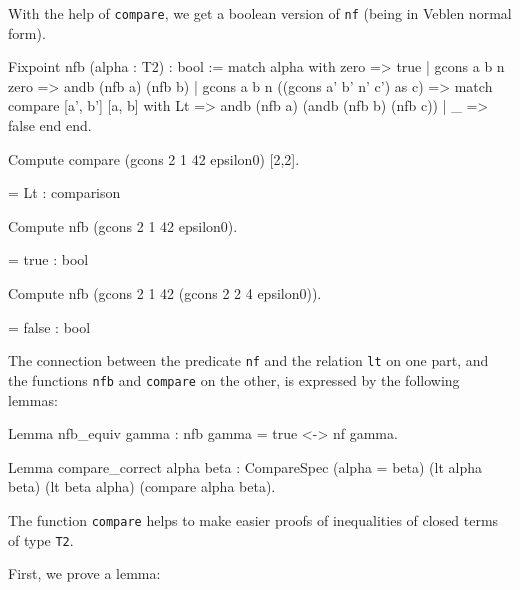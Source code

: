 {With the help of \texttt{compare}, we get a boolean version of \texttt{nf}
(being in Veblen normal form).

\begin{Coqsrc}
Fixpoint nfb (alpha : T2) : bool :=
  match alpha with
    zero => true
  | gcons a b n zero => andb (nfb a) (nfb b)
  | gcons a b n ((gcons a' b' n' c') as c) =>
    match compare [a', b'] [a, b] with
           Lt => andb (nfb a) (andb (nfb b) (nfb c))
           | _ => false
           end
end.
\end{Coqsrc}


\begin{Coqsrc}
Compute compare (gcons 2 1 42 epsilon0) [2,2].
\end{Coqsrc}

\begin{Coqanswer}
   = Lt
     : comparison
\end{Coqanswer}

\begin{Coqsrc}
Compute nfb  (gcons 2 1 42 epsilon0).
\end{Coqsrc}

\begin{Coqanswer}
   = true
     : bool
\end{Coqanswer}

\begin{Coqsrc}
Compute nfb (gcons 2 1 42 (gcons 2 2 4 epsilon0)).
\end{Coqsrc}

\begin{Coqanswer}
   = false
     : bool
\end{Coqanswer}

\begin{remark}
The connection between the predicate \texttt{nf} and the relation \texttt{lt} on one part, and the functions \texttt{nfb} and \texttt{compare} on the other, is expressed by the following lemmas:

\begin{Coqsrc}
Lemma nfb_equiv gamma : nfb gamma = true <-> nf gamma.

Lemma compare_correct alpha beta :
  CompareSpec (alpha = beta) (lt alpha beta) (lt beta alpha)
              (compare alpha beta).
\end{Coqsrc}

The function \texttt{compare} helps to make easier proofs of inequalities of
closed terms of type \texttt{T2}.

First, we prove a lemma:


\end{remark}}
